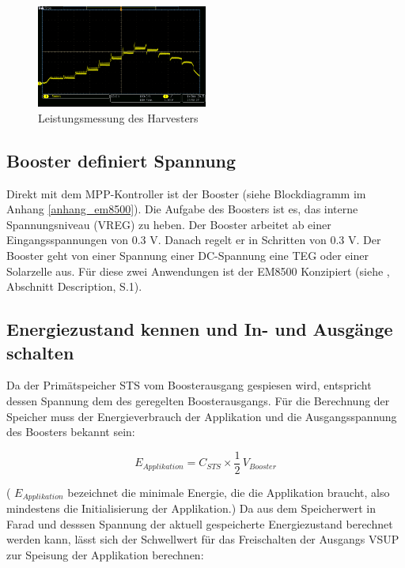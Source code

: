 \begin{figure}[ht]
    \includegraphics[width=0.5\textwidth]{2TheoretischeGrundlagen/imag/RegelungVHRV.png}
    \caption{Leistungsmessung des Harvesters}
    \label{RegelungSpannung} 
\end{figure}


\subsection{Booster definiert Spannung}
\label{eingangsspannung}

Direkt mit dem MPP-Kontroller ist der Booster (siehe Blockdiagramm im Anhang \ref{anhang_em8500}). Die Aufgabe des Boosters ist es, das interne Spannungsniveau (VREG) zu heben. Der Booster arbeitet ab einer Eingangsspannungen von 0.3 V. Danach regelt er in Schritten von 0.3 V. Der Booster geht von einer Spannung einer DC-Spannung eine TEG oder einer Solarzelle aus. Für diese zwei Anwendungen ist der EM8500 Konzipiert (siehe \cite{datasheet_EM85}, Abschnitt Description, S.1).


\subsection{Energiezustand kennen und In- und Ausgänge schalten}

Da der Primätspeicher STS vom Boosterausgang gespiesen wird, entspricht dessen Spannung dem des geregelten Boosterausgangs. Für die Berechnung der Speicher muss der Energieverbrauch der Applikation und die Ausgangsspannung des Boosters bekannt sein:

\begin{equation}
  E_{Applikation}= C_{STS} \times \frac{1}{2}\, V_{Booster}
\end{equation}
 
( $E_{Applikation}$ bezeichnet die  minimale Energie, die die Applikation braucht, also mindestens die Initialisierung der Applikation.) Da aus dem Speicherwert in Farad und desssen Spannung der aktuell gespeicherte Energiezustand berechnet werden kann, lässt sich der Schwellwert für das Freischalten der Ausgangs VSUP zur Speisung der Applikation berechnen:

